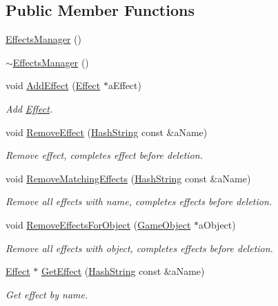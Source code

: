 \subsection*{Public Member Functions}
\begin{DoxyCompactItemize}
\item 
\hyperlink{classEffectsManager_abc2a88f49c90f47d16a22b6d3b37151b}{Effects\+Manager} ()
\item 
\hyperlink{classEffectsManager_ac0832cdc3046c0cbe3253643df5f5b56}{$\sim$\+Effects\+Manager} ()
\item 
void \hyperlink{classEffectsManager_adc9f3466f289c48171a3d7a6e22b743b}{Add\+Effect} (\hyperlink{classEffect}{Effect} $\ast$a\+Effect)
\begin{DoxyCompactList}\small\item\em Add \hyperlink{classEffect}{Effect}. \end{DoxyCompactList}\item 
void \hyperlink{classEffectsManager_a4335ea58e9793d87a676e9dc585da29b}{Remove\+Effect} (\hyperlink{classHashString}{Hash\+String} const \&a\+Name)
\begin{DoxyCompactList}\small\item\em Remove effect, completes effect before deletion. \end{DoxyCompactList}\item 
void \hyperlink{classEffectsManager_ad1be372f8b9f615033686cbc75d7a07c}{Remove\+Matching\+Effects} (\hyperlink{classHashString}{Hash\+String} const \&a\+Name)
\begin{DoxyCompactList}\small\item\em Remove all effects with name, completes effects before deletion. \end{DoxyCompactList}\item 
void \hyperlink{classEffectsManager_a97968ddb5ff4e580cb56dc7672cc5735}{Remove\+Effects\+For\+Object} (\hyperlink{classGameObject}{Game\+Object} $\ast$a\+Object)
\begin{DoxyCompactList}\small\item\em Remove all effects with object, completes effects before deletion. \end{DoxyCompactList}\item 
\hyperlink{classEffect}{Effect} $\ast$ \hyperlink{classEffectsManager_a1dbbdeef1bb873ee2ac8e6b28ae53020}{Get\+Effect} (\hyperlink{classHashString}{Hash\+String} const \&a\+Name)
\begin{DoxyCompactList}\small\item\em Get effect by name. \end{DoxyCompactList}\item 

\end{DoxyCompactItemize}
